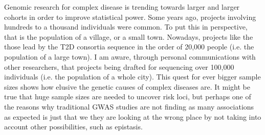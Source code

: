 Genomic research for complex disease is trending towards larger and larger cohorts in order to improve statistical power. 
Some years ago, projects involving hundreds to a thousand individuals were common. 
To put this in perspective, that is the population of a village, or a small town. 
Nowadays, projects like the those lead by the T2D consortia sequence in the order of 20,000 people (i.e. the population of a large town). 
I am aware, through personal communications with other researchers, that projects being drafted for sequencing over 100,000 individuals (i.e. the population of a whole city). 
This quest for ever bigger sample sizes shows how elusive the genetic causes of complex diseases are. 
It might be true that huge sample sizes are needed to uncover risk loci, but perhaps one of the reasons why traditional GWAS studies are not finding as many associations as expected is just that we they are looking at the wrong place by not taking into account other possibilities, such as epistasis.
